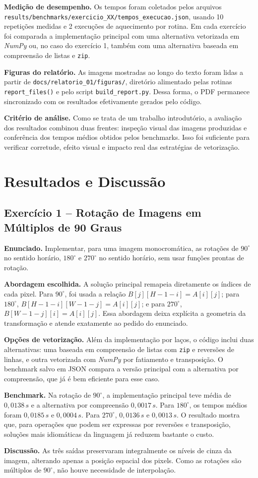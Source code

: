 \documentclass[12pt,a4paper]{article}
\newcommand{\arquivo}[1]{\nolinkurl{#1}}
\newcommand{\campo}[2]{\textbf{#1.} #2\par}
\newcommand{\exerciciosubsection}[2]{\subsection{Exercício #1 -- #2}}
\begin{document}
\campo{Medição de desempenho}{Os tempos foram coletados pelos arquivos \arquivo{results/benchmarks/exercicio\_XX/tempos\_execucao.json}, usando 10 repetições medidas e 2 execuções de aquecimento por rotina. Em cada exercício foi comparada a implementação principal com uma alternativa vetorizada em \textit{NumPy} ou, no caso do exercício 1, também com uma alternativa baseada em compreensão de listas e \texttt{zip}.}
\campo{Figuras do relatório}{As imagens mostradas ao longo do texto foram lidas a partir de \arquivo{docs/relatorio_01/figuras/}, diretório alimentado pelas rotinas \texttt{report\_files()} e pelo script \arquivo{build\_report.py}. Dessa forma, o PDF permanece sincronizado com os resultados efetivamente gerados pelo código.}
\campo{Critério de análise}{Como se trata de um trabalho introdutório, a avaliação dos resultados combinou duas frentes: inspeção visual das imagens produzidas e conferência dos tempos médios obtidos pelos benchmarks. Isso foi suficiente para verificar corretude, efeito visual e impacto real das estratégias de vetorização.}

\section{Resultados e Discussão}

\exerciciosubsection{1}{Rotação de Imagens em Múltiplos de 90 Graus}

\campo{Enunciado}{Implementar, para uma imagem monocromática, as rotações de $90^\circ$ no sentido horário, $180^\circ$ e $270^\circ$ no sentido horário, sem usar funções prontas de rotação.}
\campo{Abordagem escolhida}{A solução principal remapeia diretamente os índices de cada pixel. Para $90^\circ$, foi usada a relação $B[j][H-1-i]=A[i][j]$; para $180^\circ$, $B[H-1-i][W-1-j]=A[i][j]$; e para $270^\circ$, $B[W-1-j][i]=A[i][j]$. Essa abordagem deixa explícita a geometria da transformação e atende exatamente ao pedido do enunciado.}
\campo{Opções de vetorização}{Além da implementação por laços, o código inclui duas alternativas: uma baseada em compreensão de listas com \texttt{zip} e reversões de linhas, e outra vetorizada com \textit{NumPy} por fatiamento e transposição. O benchmark salvo em JSON compara a versão principal com a alternativa por compreensão, que já é bem eficiente para esse caso.}
\campo{Benchmark}{Na rotação de $90^\circ$, a implementação principal teve média de $0{,}0138\,s$ e a alternativa por compreensão $0{,}0017\,s$. Para $180^\circ$, os tempos médios foram $0{,}0185\,s$ e $0{,}0004\,s$. Para $270^\circ$, $0{,}0136\,s$ e $0{,}0013\,s$. O resultado mostra que, para operações que podem ser expressas por reversões e transposição, soluções mais idiomáticas da linguagem já reduzem bastante o custo.}
\campo{Discussão}{As três saídas preservaram integralmente os níveis de cinza da imagem, alterando apenas a posição espacial dos pixels. Como as rotações são múltiplos de $90^\circ$, não houve necessidade de interpolação.}
\end{document}
